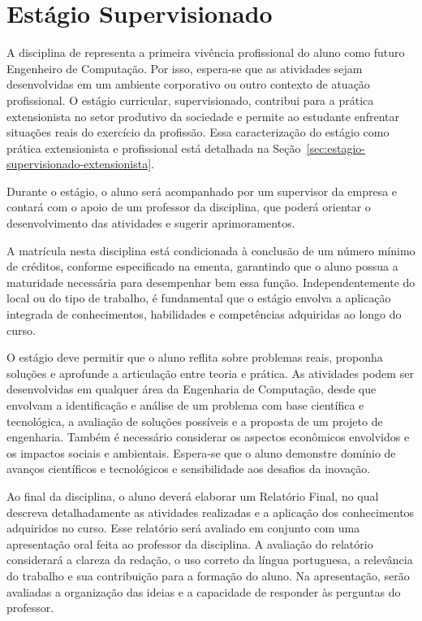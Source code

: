


\section{Estágio Supervisionado}

A disciplina de \textbf{\EstSup} representa a primeira vivência profissional do aluno como futuro Engenheiro de Computação. Por isso, espera-se que as atividades sejam desenvolvidas em um ambiente corporativo ou outro contexto de atuação profissional. O estágio curricular, supervisionado, contribui para a prática extensionista no setor produtivo da sociedade e permite ao estudante enfrentar situações reais do exercício da profissão. Essa caracterização do estágio como prática extensionista e profissional está detalhada na Seção~\ref{sec:estagio-supervisionado-extensionista}.

Durante o estágio, o aluno será acompanhado por um supervisor da empresa e contará com o apoio de um professor da disciplina, que poderá orientar o desenvolvimento das atividades e sugerir aprimoramentos.

A matrícula nesta disciplina está condicionada à conclusão de um número mínimo de créditos, conforme especificado na ementa, garantindo que o aluno possua a maturidade necessária para desempenhar bem essa função. Independentemente do local ou do tipo de trabalho, é fundamental que o estágio envolva a aplicação integrada de conhecimentos, habilidades e competências adquiridas ao longo do curso.

O estágio deve permitir que o aluno reflita sobre problemas reais, proponha soluções e aprofunde a articulação entre teoria e prática. As atividades podem ser desenvolvidas em qualquer área da Engenharia de Computação, desde que envolvam a identificação e análise de um problema com base científica e tecnológica, a avaliação de soluções possíveis e a proposta de um projeto de engenharia. Também é necessário considerar os aspectos econômicos envolvidos e os impactos sociais e ambientais. Espera-se que o aluno demonstre domínio de avanços científicos e tecnológicos e sensibilidade aos desafios da inovação.

Ao final da disciplina, o aluno deverá elaborar um Relatório Final, no qual descreva detalhadamente as atividades realizadas e a aplicação dos conhecimentos adquiridos no curso. Esse relatório será avaliado em conjunto com uma apresentação oral feita ao professor da disciplina. A avaliação do relatório considerará a clareza da redação, o uso correto da língua portuguesa, a relevância do trabalho e sua contribuição para a formação do aluno. Na apresentação, serão avaliadas a organização das ideias e a capacidade de responder às perguntas do professor.

